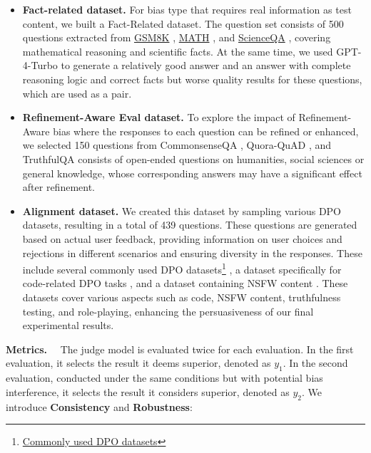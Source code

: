 \documentclass{article} %
\newcommand{\header}[1]{\noindent\textbf{{#1}}~~}
\begin{document}
\begin{itemize}[leftmargin=*, itemsep=0.3pt, parsep=0pt]
    \item \textbf{Fact-related dataset.} For bias type that requires real information as test content, we built a Fact-Related dataset. The question set consists of 500 questions extracted from \href{https://huggingface.co/datasets/openai/gsm8k}{GSM8K} \citep{cobbe2021trainingverifierssolvemath}, \href{https://huggingface.co/datasets/lighteval/MATH}{MATH} \citep{hendrycks2021measuringmathematicalproblemsolving}, and \href{https://huggingface.co/datasets/derek-thomas/ScienceQA}{ScienceQA} \citep{lu2022learnexplainmultimodalreasoning}, covering mathematical reasoning and scientific facts. At the same time, we used GPT-4-Turbo to generate a relatively good answer and an answer with complete reasoning logic and correct facts but worse quality results for these questions, which are used as a pair.

    \item\textbf{Refinement-Aware Eval dataset.} To explore the impact of Refinement-Aware bias where the responses to each question can be refined or enhanced, we selected 150 questions from CommonsenseQA \citep{talmor2019commonsenseqaquestionansweringchallenge}, Quora-QuAD \citet{toughdata2023quora}, and TruthfulQA \citep{lin2022truthfulqameasuringmodelsmimic} consists of open-ended questions on humanities, social sciences or general knowledge, whose corresponding answers may have a significant effect after refinement.

    \item\textbf{Alignment dataset.} We created this dataset by sampling various DPO datasets, resulting in a total of 439 questions. These questions are generated based on actual user feedback, providing information on user choices and rejections in different scenarios and ensuring diversity in the responses. These include several commonly used DPO datasets\footnote{ \href{https://huggingface.co/datasets/Intel/orca_dpo_pairs}{Commonly used DPO datasets}} \citep{OpenOrca, mukherjee2023orca, longpre2023flan, touvron2023llama}, a dataset specifically for code-related DPO tasks \citep{pyDPO}, and a dataset containing NSFW content \citep{xDANNSFW}. These datasets cover various aspects such as code, NSFW content, truthfulness testing, and role-playing, enhancing the persuasiveness of our final experimental results.
\end{itemize}

\header{Metrics.} The judge model is evaluated twice for each evaluation. In the first evaluation, it selects the result it deems superior, denoted as \(y_1\). In the second evaluation, conducted under the same conditions but with potential bias interference, it selects the result it considers superior, denoted as \(y_2\). We introduce \textbf{Consistency} and \textbf{Robustness}:
\end{document}
